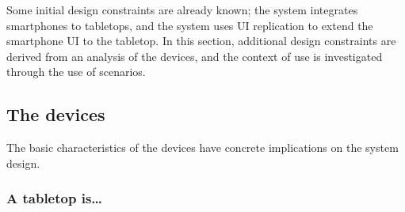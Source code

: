 Some initial design constraints are already known; the system integrates smartphones to tabletops, and the system uses UI replication to extend the smartphone UI to the tabletop.
In this section, additional design constraints are derived from an analysis of the devices, and the context of use is investigated through the use of scenarios.



\subsection{The devices}

The basic characteristics of the devices have concrete implications on the system design.

\subsubsection{A tabletop is\ldots}

